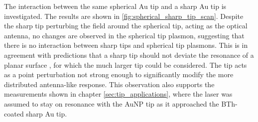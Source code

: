 \documentclass[a4paper]{article}
\begin{document}
The interaction between the same spherical Au tip and a sharp Au tip is investigated. The results are shown in \autoref{fig:spherical_sharp_tip_scan}. Despite the sharp tip perturbing the field around the spherical tip, acting as the optical antenna, no changes are observed in the spherical tip plasmon, suggesting that there is no interaction between sharp tips and spherical tip plasmons. This is in agreement with predictions that a sharp tip should not deviate the resonance of a planar surface \cite{downes2006, hugall2012}, for which the much larger tip could be considered. The tip acts as a point perturbation not strong enough to significantly modify the more distributed antenna-like response.
This observation also supports the measurements shown in chapter \ref{sec:tip_applications}, where the laser was assumed to stay on resonance with the AuNP tip as it approached the BTh-coated sharp Au tip.
\end{document}
